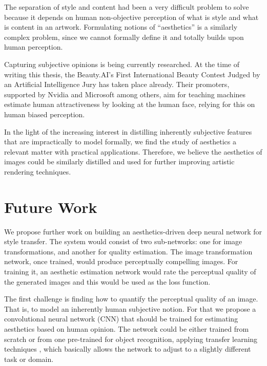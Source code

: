The separation of style and content had been a very difficult problem to solve because it depends on human non-objective perception of what is style and what is content in an artwork.
Formulating notions of ``aesthetics'' is a similarly complex problem, since we cannot formally define it and totally builds upon human perception.

Capturing subjective opinions is being currently researched.
At the time of writing this thesis, the Beauty.AI's First International Beauty Contest Judged by an Artificial Intelligence Jury \cite{YouthLaboratories} has taken place already.
Their promoters, supported by Nvidia and Microsoft among others, aim for teaching machines estimate human attractiveness by looking at the human face, relying for this on human biased perception.

In the light of the increasing interest in distilling inherently subjective features that are impractically to model formally, we find the study of aesthetics a relevant matter with practical applications.
Therefore, we believe the aesthetics of images could be similarly distilled and used for further improving artistic rendering techniques.



\section{Future Work}
\label{sec:conclusion:future}

We propose further work on building an aesthetics-driven deep neural network for style transfer.
The system would consist of two sub-networks: one for image transformations, and another for quality estimation.
The image transformation network, once trained, would produce perceptually compelling images.
For training it, an aesthetic estimation network would rate the perceptual quality of the generated images and this would be used as the loss function.

The first challenge is finding how to quantify the perceptual quality of an image.
That is, to model an inherently human subjective notion.
For that we propose a convolutional neural network (CNN) that should be trained for estimating aesthetics based on human opinion.
The network could be either trained from scratch or from one pre-trained for object recognition, applying transfer learning techniques \cite{Pan2010}, which basically allows the network to adjust to a slightly different task or domain.

